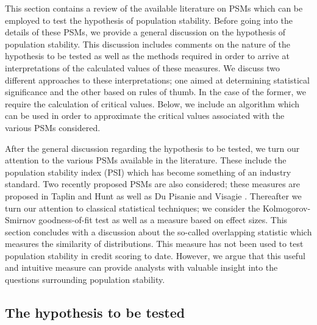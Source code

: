 \documentclass{article}
\theoremstyle{def}
\newcommand\CB[1]{{\color{blue} #1}}
\begin{document}
This section contains a review of the available literature on PSMs which can be employed to test the hypothesis of population stability.
Before going into the details of these PSMs, we provide a general discussion on the hypothesis of population stability. This discussion includes comments on the nature of the hypothesis to be tested as well as the methods required in order to arrive at interpretations of the calculated values of these measures. We discuss two different approaches to these interpretations; one aimed at determining statistical significance and the other based on rules of thumb. In the case of the former, we require the calculation of critical values. Below, we include an algorithm which can be used in order to approximate the critical values associated with the various PSMs considered.

After the general discussion regarding the hypothesis to be tested, we turn our attention to the various PSMs available in the literature. These include the population stability index (PSI) which has become something of an industry standard. Two recently proposed PSMs are also considered; these measures are proposed in Taplin and Hunt \cite{TAPLINHUNT2019} as well as Du Pisanie and Visagie \cite{DUPISANIEVISAGIE2020}. Thereafter we turn our attention to classical statistical techniques; we consider the Kolmogorov-Smirnov goodness-of-fit test as well as a measure based on effect sizes. This section concludes with a discussion about the so-called overlapping statistic which measures the similarity of distributions. This measure has not been used to test population stability in credit scoring to date. However, we argue that this useful and intuitive measure can provide analysts with valuable insight into the questions surrounding population stability.

\subsection{The hypothesis to be tested}\label{HTBT}
\end{document}
